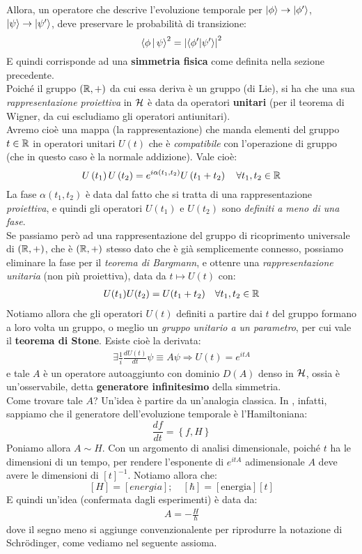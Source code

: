 \documentclass[../../FisicaTeorica.tex]{subfiles}
\begin{document}
Allora, un operatore che descrive l'evoluzione temporale per $\Ket{\phi}\to |\phi^\prime\rangle$, $\Ket{\psi}\to |\psi^\prime\rangle$, deve preservare le probabilità di transizione:
\[
\Braket{\phi|\psi}^2=\left|\left\langle\phi^\prime\middle|\psi^\prime\right\rangle\right|^2
\]
E quindi corrisponde ad una \textbf{simmetria fisica} come definita nella sezione precedente.\\
Poiché il gruppo $(\mathbb{R},+)$ da cui essa deriva è un gruppo  (di Lie), si ha che una sua \textit{rappresentazione proiettiva} in $\mathcal{H}$ è data da operatori \textbf{unitari} (per il teorema di Wigner, da cui escludiamo gli operatori antiunitari).\\
Avremo cioè una mappa (la rappresentazione) che manda elementi del gruppo $t\in \mathbb{R}$ in operatori unitari $U(t)$ che è \textit{compatibile} con l'operazione di gruppo (che in questo caso è la normale addizione). Vale cioè:
\[
U\left(t_1\right)U\left(t_2\right)=e^{i\alpha\left(t_1,t_2\right)}U\left(t_1+t_2\right)\quad \forall t_1,t_2\in \mathbb{R}
\]
La fase $\alpha(t_1,t_2)$ è data dal fatto che si tratta di una rappresentazione \textit{proiettiva}, e quindi gli operatori $U(t_1)$ e $U(t_2)$ sono \textit{definiti a meno di una fase}.\\
Se passiamo però ad una rappresentazione del gruppo di ricoprimento universale di $(\mathbb{R},+)$, che è $(\mathbb{R},+)$ stesso dato che è già semplicemente connesso, possiamo eliminare la fase per il \textit{teorema di Bargmann}, e ottenre una \textit{rappresentazione unitaria} (non più proiettiva), data da $t\mapsto U(t)$ con:
\begin{align*}
U(t_1)U(t_2) = U(t_1+t_2)\quad \forall t_1,t_2 \in \mathbb{R}
\end{align*}
Notiamo allora che gli operatori $U(t)$ definiti a partire dai $t$ del gruppo formano a loro volta un gruppo, o meglio un \textit{gruppo unitario a un parametro}, per cui vale il \textbf{teorema di Stone}. Esiste cioè la derivata:
\begin{align*}
\exists \frac{1}{i}\frac{dU(t)}{dt}\psi \equiv A\psi \Rightarrow U(t) = e^{itA}
\end{align*}
e tale $A$ è un operatore autoaggiunto con dominio $D(A)$ denso in $\mathcal{H}$, ossia è un'osservabile, detta \textbf{generatore infinitesimo} della simmetria.\\ %

Come trovare tale $A$? Un'idea è partire da un'analogia classica. In \MC, infatti, sappiamo che il generatore dell'evoluzione temporale è l'Hamiltoniana:
\[
\frac{df}{dt}=\left\{f,H\right\}
\]
Poniamo allora $A \sim H$. Con un argomento di analisi dimensionale, poiché $t$ ha le dimensioni di un tempo, per rendere l'esponente di $e^{itA}$ adimensionale $A$ deve avere le dimensioni di $[t]^{-1}$. Notiamo allora che: 
\[
\left[H\right]=\left[energia\right]; \quad
\left[\hbar\right]=\left[\text{energia}\right]\left[t\right]
\]
E quindi un'idea (confermata dagli esperimenti) è data da:
\begin{align*}
A=-\frac{H}{\hbar}
\end{align*}
dove il segno meno si aggiunge convenzionalente per riprodurre la notazione di Schrödinger, come vediamo nel seguente assioma.
\end{document}
